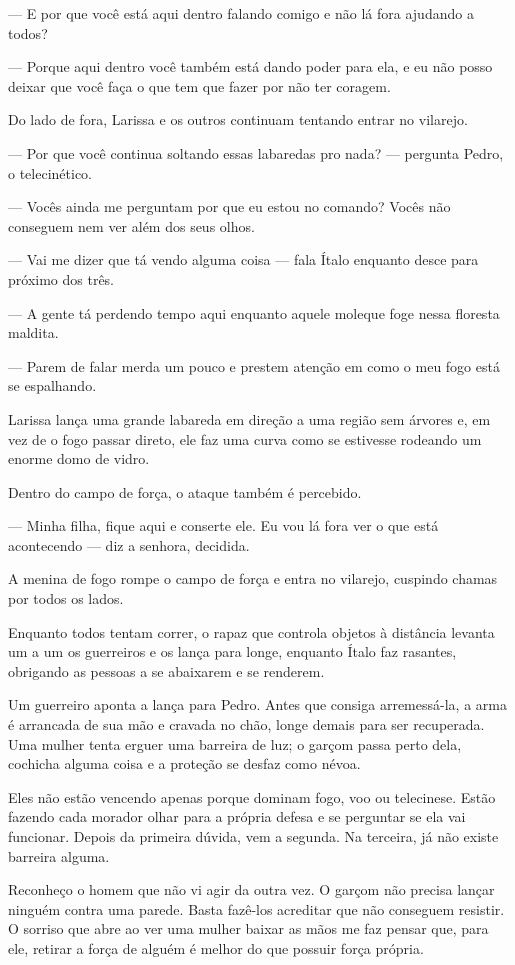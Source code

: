 — E por que você está aqui dentro falando comigo e não lá fora ajudando a todos?

— Porque aqui dentro você também está dando poder para ela, e eu não posso deixar que você faça o que tem que fazer por não ter coragem.

Do lado de fora, Larissa e os outros continuam tentando entrar no vilarejo.

— Por que você continua soltando essas labaredas pro nada? — pergunta Pedro, o telecinético.

— Vocês ainda me perguntam por que eu estou no comando? Vocês não conseguem nem ver além dos seus olhos.

— Vai me dizer que tá vendo alguma coisa — fala Ítalo enquanto desce para próximo dos três.

— A gente tá perdendo tempo aqui enquanto aquele moleque foge nessa floresta maldita.

— Parem de falar merda um pouco e prestem atenção em como o meu fogo está se espalhando.

Larissa lança uma grande labareda em direção a uma região sem árvores e, em vez de o fogo passar direto, ele faz uma curva como se estivesse rodeando um enorme domo de vidro.

Dentro do campo de força, o ataque também é percebido.

— Minha filha, fique aqui e conserte ele. Eu vou lá fora ver o que está acontecendo — diz a senhora, decidida.

A menina de fogo rompe o campo de força e entra no vilarejo, cuspindo chamas por todos os lados.

Enquanto todos tentam correr, o rapaz que controla objetos à distância levanta um a um os guerreiros e os lança para longe, enquanto Ítalo faz rasantes, obrigando as pessoas a se abaixarem e se renderem.

Um guerreiro aponta a lança para Pedro. Antes que consiga arremessá-la, a arma é arrancada de sua mão e cravada no chão, longe demais para ser recuperada. Uma mulher tenta erguer uma barreira de luz; o garçom passa perto dela, cochicha alguma coisa e a proteção se desfaz como névoa.

Eles não estão vencendo apenas porque dominam fogo, voo ou telecinese. Estão fazendo cada morador olhar para a própria defesa e se perguntar se ela vai funcionar. Depois da primeira dúvida, vem a segunda. Na terceira, já não existe barreira alguma.

Reconheço o homem que não vi agir da outra vez. O garçom não precisa lançar ninguém contra uma parede. Basta fazê-los acreditar que não conseguem resistir. O sorriso que abre ao ver uma mulher baixar as mãos me faz pensar que, para ele, retirar a força de alguém é melhor do que possuir força própria.

